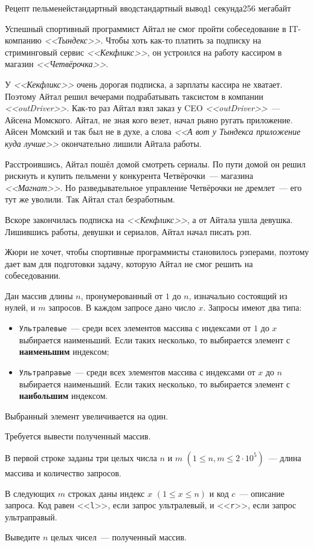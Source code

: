 \begin{problem}{Рецепт пельменей}{стандартный ввод}{стандартный вывод}{1 секунда}{256 мегабайт}

Успешный спортивный программист Айтал не смог пройти собеседование в IT-компанию \textit{<<Тындекс>>}. Чтобы хоть как-то платить за подписку на стриминговый сервис \textit{<<Кекфликс>>}, он устроился на работу кассиром в магазин \textit{<<Четвёрочка>>}.

У \textit{<<Кекфликс>>} очень дорогая подписка, а зарплаты кассира не хватает. Поэтому Айтал решил вечерами подрабатывать таксистом в компании \textit{<<outDriver>>}. Как-то раз Айтал взял заказ у CEO \textit{<<outDriver>>}~--- Айсена Момского. Айтал, не зная кого везет, начал рьяно ругать приложение. Айсен Момский и так был не в духе, а слова \textit{<<А вот у Тындекса приложение куда лучше>>} окончательно лишили Айтала работы.

Расстроившись, Айтал пошёл домой смотреть сериалы. По пути домой он решил рискнуть и купить пельмени у конкурента Четвёрочки~--- магазина \textit{<<Магнат>>}. Но разведывательное управление Четвёрочки не дремлет~--- его тут же уволили. Так Айтал стал безработным. 

Вскоре закончилась подписка на \textit{<<Кекфликс>>}, а от Айтала ушла девушка. Лишившись работы, девушки и сериалов, Айтал начал писать рэп. 

Жюри не хочет, чтобы спортивные программисты становилось рэперами, поэтому дает вам для подготовки задачу, которую Айтал не смог решить на собеседовании.

Дан массив длины $n$, пронумерованный от $1$ до $n$, изначально состоящий из нулей, и $m$ запросов. В каждом запросе дано число $x$. Запросы имеют два типа:
\begin{itemize}
  \item \texttt{Ультралевые}~--- среди всех элементов массива с индексами от $1$ до $x$ выбирается наименьший. Если таких несколько, то выбирается элемент с \textbf{наименьшим} индексом;
  \item \texttt{Ультраправые}~--- среди всех элементов массива с индексами от $x$ до $n$ выбирается наименьший. Если таких несколько, то выбирается элемент с \textbf{наибольшим} индексом.
\end{itemize}
Выбранный элемент увеличивается на один.

Требуется вывести полученный массив.

\InputFile
В первой строке заданы три целых числа $n$ и $m$ $(1 \le n, m \le 2 \cdot 10^5)$~--- длина массива и количество запросов.

В следующих $m$ строках даны индекс $x$ $(1 \le x \le n)$ и код $c$~--- описание запроса. Код равен <<\texttt{l}>>, если запрос ультралевый, и <<\texttt{r}>>, если запрос ультраправый.

\OutputFile
Выведите $n$ целых чисел~--- полученный массив.

\Examples

\begin{example}
%
%
\end{example}

\end{problem}

